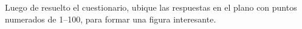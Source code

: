 \documentclass[10pt,twoside]{article}
\begin{document}
Luego de resuelto el cuestionario, ubique las respuestas en el plano con puntos numerados de 1--100, para formar una figura interesante.
\end{document}
